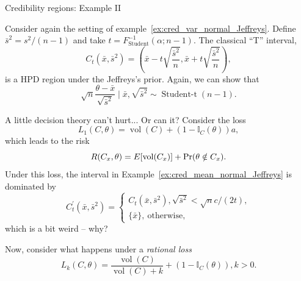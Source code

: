 \begin{frame}{Credibility regions: Example II}
\begin{example}
\label{ex:cred_mean_normal_Jeffreys}
 Consider again the setting of example~\ref{ex:cred_var_normal_Jeffreys}.
 Define $\bar{s}^2 = s^2/(n-1)$ and take $t = F_{\text{Student}}^{-1}(\alpha; n-1)$.
 The classical ``T'' interval,
 \begin{equation*}
  C_t(\bar{x}, \bar{s}^2) = \left(\bar{x} - t\sqrt{\frac{\bar{s}^2}{n}}, \bar{x} + t\sqrt{\frac{\bar{s}^2}{n}}\right),
 \end{equation*}
 is a HPD region under the Jeffreys's prior.
 Again, we can show that
 \begin{equation*}
  \sqrt{n}\frac{\theta -\bar{x}}{\sqrt{\bar{s}^2}} \mid \bar{x}, \sqrt{\bar{s}^2} \sim \operatorname{Student-t}(n-1).
 \end{equation*}
\end{example}
 
\end{frame}
\begin{frame}{A little decision theory can't hurt... Or can it?}
 Consider the loss
 \begin{equation*}
  L_1(C, \theta) = \operatorname{vol}(C) + (1-\mathbb{I}_{C}(\theta))a,
 \end{equation*}
 which leads to the risk
 \begin{equation*}
  R(C_x, \theta) = E[\operatorname{vol}(C_x)] + \operatorname{Pr}(\theta \notin C_x).
 \end{equation*}
Under this loss, the interval in Example~\ref{ex:cred_mean_normal_Jeffreys} is dominated by 
\begin{equation*}
 C_t^\prime(\bar{x}, \bar{s}^2) = \begin{cases}
C_t(\bar{x}, \bar{s}^2), \sqrt{\bar{s}^2} < \sqrt{n}c/(2t),\\
\{\bar{x}\}, \: \text{otherwise},
\end{cases}
\end{equation*}
which is a bit weird -- why?

Now, consider what happens under a \textit{rational loss}
\begin{equation*}
 L_k(C, \theta) = \frac{\operatorname{vol}(C)}{\operatorname{vol}(C) + k} + (1-\mathbb{I}_{C}(\theta)), k >0.
\end{equation*}
\end{frame}

